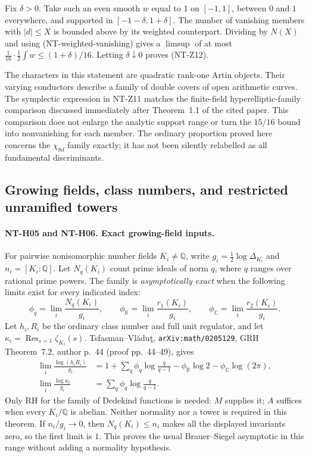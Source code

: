 Fix $\delta>0$.  Take such an even smooth $w$ equal to $1$ on
$[-1,1]$, between $0$ and $1$ everywhere, and supported in
$[-1-\delta,1+\delta]$.  The number of vanishing members with
$|d|\le X$ is bounded above by its weighted counterpart.  Dividing by
$N(X)$ and using (NT-weighted-vanishing) gives a $\limsup$ of at most
$\frac1{16}\cdot\frac12\int w\le(1+\delta)/16$.
Letting $\delta\downarrow0$ proves (NT-Z12).

The characters in this statement are quadratic rank-one Artin objects.
Their varying conductors describe a family of double covers of open
arithmetic curves.  The symplectic expression in NT-Z11 matches the
finite-field hyperelliptic-family comparison discussed immediately after
Theorem~1.1 of the cited paper.  This comparison does not enlarge the
analytic support range or turn the $15/16$ bound into nonvanishing for
each member.  The ordinary proportion proved here concerns the
$\chi_{8d}$ family exactly; it has not been silently relabelled as all
fundamental discriminants.

\subsection{Growing fields, class numbers, and restricted unramified towers}

\paragraph{NT-H05 and NT-H06. Exact growing-field inputs.}
For pairwise nonisomorphic number fields $K_i\ne\mathbb Q$, write
$g_i=\tfrac12\log\Delta_{K_i}$ and $n_i=[K_i:\mathbb Q]$.
Let $N_q(K_i)$ count prime ideals of norm $q$, where $q$ ranges over
rational prime powers.  The family is \emph{asymptotically exact} when
the following limits exist for every indicated index:
\[
 \phi_q=\lim_i\frac{N_q(K_i)}{g_i},\qquad
 \phi_{\mathbb R}=\lim_i\frac{r_1(K_i)}{g_i},\qquad
 \phi_{\mathbb C}=\lim_i\frac{r_2(K_i)}{g_i}.
\]
Let $h_i,R_i$ be the ordinary class number and full unit regulator, and
let $\kappa_i=\operatorname{Res}_{s=1}\zeta_{K_i}(s)$.
Tsfasman--Vl\u adu\c t, \texttt{arXiv:math/0205129},
GRH Theorem~7.2, author p.~44 (proof pp.~44--49), gives
\begin{align*}
 \lim_i\frac{\log(h_iR_i)}{g_i}
 &=1+\sum_q\phi_q\log\frac q{q-1}
      -\phi_{\mathbb R}\log2-\phi_{\mathbb C}\log(2\pi),\\
 \lim_i\frac{\log\kappa_i}{g_i}
 &=\sum_q\phi_q\log\frac q{q-1}.
\end{align*}
Only RH for the family of Dedekind functions is needed: $M$ supplies it;
$A$ suffices when every $K_i/\mathbb Q$ is abelian.  Neither normality
nor a tower is required in this theorem.  If $n_i/g_i\to0$, then
$N_q(K_i)\le n_i$ makes all the displayed invariants zero, so the
first limit is $1$.  This proves the usual Brauer--Siegel asymptotic
in this range without adding a normality hypothesis.


